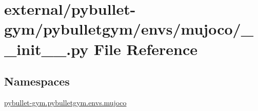 \hypertarget{external_2pybullet-gym_2pybulletgym_2envs_2mujoco_2____init_____8py}{}\section{external/pybullet-\/gym/pybulletgym/envs/mujoco/\+\_\+\+\_\+init\+\_\+\+\_\+.py File Reference}
\label{external_2pybullet-gym_2pybulletgym_2envs_2mujoco_2____init_____8py}
\subsection*{Namespaces}
\begin{DoxyCompactItemize}
\item 
 \hyperlink{namespacepybullet-gym_1_1pybulletgym_1_1envs_1_1mujoco}{pybullet-\/gym.\+pybulletgym.\+envs.\+mujoco}
\end{DoxyCompactItemize}

